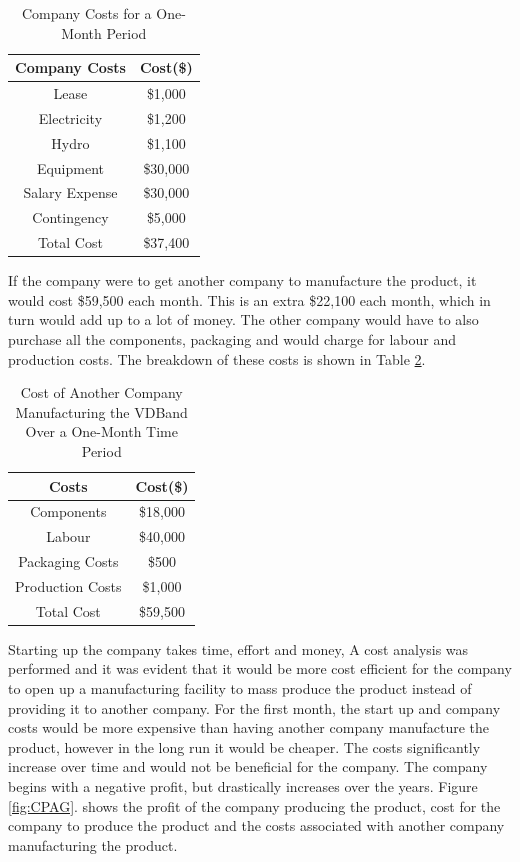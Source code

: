 \documentclass[11.5pt]{article}
\begin{document}
\begin{table}[H]
	\centering
	\caption{Company Costs for a One-Month Period}
	\vspace{3mm}
	\begin{tabular}{cc}
	\hline
		Company Costs & Cost(\$) \\
	\hline
		Lease & \$1,000 \\
	    Electricity  & \$1,200 \\
		Hydro & \$1,100\\
		Equipment & \$30,000 \\
		Salary Expense & \$30,000 \\
		Contingency & \$5,000 \\
	\hline
	    Total Cost & \$37,400 \\
	 \hline 
	\end{tabular}
	\label{table:CCPM}
\end{table}

If the company were to get another company to manufacture the product, it would cost \$59,500 each month. This is an extra \$22,100 each month, which in turn would add up to a lot of money. The other company would have to also purchase all the components, packaging and would charge for labour and production costs. The breakdown of these costs is shown in Table \ref{table:OCC}.

\begin{table}[H]
	\centering
	\caption{Cost of Another Company Manufacturing the VDBand Over a One-Month Time Period}
	\vspace{3mm}
	\begin{tabular}{cc}
	\hline
		Costs & Cost(\$) \\
	\hline
		Components & \$18,000 \\
	    Labour & \$40,000 \\
		Packaging Costs & \$500\\
		Production Costs & \$1,000 \\
	\hline
	    Total Cost & \$59,500 \\
	 \hline 
	\end{tabular}
	\label{table:OCC}
\end{table}

Starting up the company takes time, effort and money, A cost analysis was performed and it was evident that it would be more cost efficient for the company to open up a manufacturing facility to mass produce the product instead of providing it to another company. For the first month, the start up and company costs would be more expensive than having another company manufacture the product, however in the long run it would be cheaper. The costs significantly increase over time and would not be beneficial for the company. The company begins with a negative profit, but drastically increases over the years. Figure \ref{fig:CPAG}. shows the profit of the company producing the product, cost for the company to produce the product and the costs associated with another company manufacturing the product.
\end{document}
